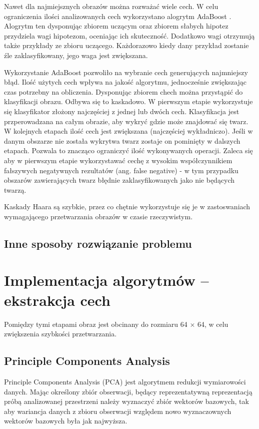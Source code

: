 \documentclass{article}
\begin{document}
Nawet dla najmiejsznych obrazów można rozważać wiele cech. W celu ograniczenia ilości analizowanych cech wykorzystano alogrytm AdaBoost \cite{AdaBoost}. Alogrytm ten dysponując zbiorem uczącym oraz zbiorem słabych hipotez przydziela wagi hipotezom, oceniając ich skuteczność. Dodatkowo wagi otrzymują także przykłady ze zbioru uczącego. Każdorazowo kiedy dany przykład zostanie źle zaklasyfikowany, jego waga jest zwiększana. 

Wykorzystanie AdaBoost pozwoliło na wybranie cech generujących najmniejszy błąd. Ilość użytych cech wpływa na jakość algorytmu, jednocześnie zwiększając czas potrzebny na obliczenia. Dysponując zbiorem chech można przystąpić do klasyfikacji obrazu. Odbywa się to kaskadowo. W pierwszym etapie wykorzystuje się klasyfikator złożony najczęściej z jednej lub dwóch cech. Klasyfikacja jest przperowadzana na całym obrazie, aby wykryć gdzie może znajdować się twarz. W kolejnych etapach ilość cech jest zwiększana (najczęściej wykładniczo). Jeśli w danym obszarze nie została wykrytwa twarz zostaje on pominięty w dalszych etapach. Pozwala to znacząco ograniczyć ilość wykonywanych operacji. Zaleca się aby w pierwszym etapie wykorzystawać cechę z wysokim współczynnikiem fałszywych negatywnych rezultatów (ang. false negative) - w tym przypadku obszarów zawierających twarz błędnie zaklasyfikowanych jako nie będących twarzą.

Kaskady Haara są szybkie, przez co chętnie wykorzystuje się je w zastoswaniach wymagającego przetwarzania obrazów w czasie rzeczywistym.

\subsection{Inne sposoby rozwiązanie problemu}
 
 \newpage
 
\section{Implementacja algorytmów – ekstrakcja cech}

Pomiędzy tymi etapami obraz jest obcinany do rozmiaru 64 $\times$ 64, w celu zwiększenia szybkości przetwarzania.
 
\subsection{Principle Components Analysis}

Principle Components Analysis (PCA) jest algorytmem redukcji wymiarowości danych. Mając określony zbiór obserwacji, będący reprezentatywną reprezentacją próbą analizowanej przestrzeni należy wyznaczyć zbiór wektorów bazowych, tak aby wariancja danych z zbioru obserwacji względem nowo wyznaczownych wektorów bazowych była jak najwyższa.
\end{document}
